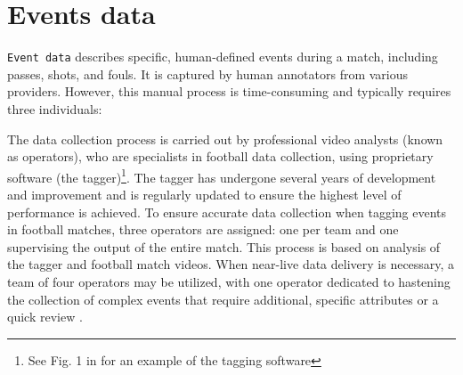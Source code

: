 \documentclass[
  10pt,
  twoside,nohyper]{book}
\begin{document}
\section{Events data}\label{events-data}

\texttt{Event\ data} describes specific, human-defined events during a match,
including passes, shots, and fouls. It is captured by human annotators
from various providers. However, this manual process is time-consuming
and typically requires three individuals:

The data collection process is carried out by professional video
analysts (known as operators), who are specialists in football data
collection, using proprietary software (the tagger)\footnote{See Fig. 1 in \autocite{3} for an example of the tagging software}. The tagger has
undergone several years of development and improvement and is regularly
updated to ensure the highest level of performance is achieved. To
ensure accurate data collection when tagging events in football matches,
three operators are assigned: one per team and one supervising the
output of the entire match. This process is based on analysis of the
tagger and football match videos. When near-live data delivery is
necessary, a team of four operators may be utilized, with one operator
dedicated to hastening the collection of complex events that require
additional, specific attributes or a quick review \autocite{3}.

\begin{table}[!h]
\centering
\caption{\label{tab:event}Example of an events dataset of a game.}
\centering
{}
\end{table}
\end{document}
